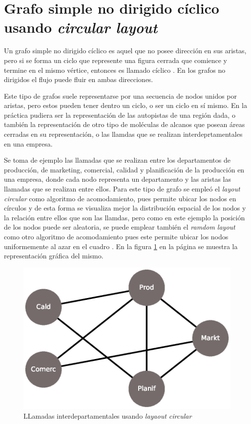 \documentclass{article}
\begin{document}
\section{Grafo simple no dirigido cíclico usando \textit{circular layout}}

Un grafo simple no dirigido cíclico es aquel que no posee dirección en sus aristas, pero si se forma un ciclo que represente una figura cerrada que comience y termine en el mismo vértice, entonces es llamado cíclico \cite{redes}. En los grafos no dirigidos el flujo puede fluir en ambas direcciones.

Este tipo de grafos suele representarse por una secuencia de nodos unidos por aristas, pero estos pueden tener dentro un ciclo, o ser un ciclo en sí mismo. En la práctica pudiera ser la representación de las autopistas de una región dada, o también la representación de otro tipo de moléculas de alcanos que posean áreas cerradas en su representación, o las llamdas que se realizan interdeprtamentales en una empresa.

Se toma de ejemplo las llamadas que se realizan entre los departamentos de producción, de marketing, comercial, calidad y planificación de la producción en una empresa, donde cada nodo representa un departamento y las aristas las llamadas que se realizan entre ellos. Para este tipo de grafo se empleó el \textit{layout circular} como algoritmo de acomodamiento, pues permite ubicar los nodos en círculos \cite{layout} y de esta forma se visualiza mejor la distribución espacial de los nodos y la relación entre ellos que son las llamdas, pero como en este ejemplo la posición de los nodos puede ser aleatoria, se puede emplear también el \textit{ramdom layout} como otro algoritmo de acomodamiento pues este permite ubicar los nodos uniformemente al azar en el cuadro \cite{layout}. En la figura \ref{fig:Fig02} en la página \pageref{fig:Fig02} se muestra la representación gráfica del mismo.

\newpage


\begin{figure}[h]
    \centering
    \includegraphics[scale=0.4]{imagenes1/Fig02.eps}
    \caption{LLamadas interdepartamentales usando \textit{layaout circular}}
    \label{fig:Fig02}
\end{figure}
\end{document}
